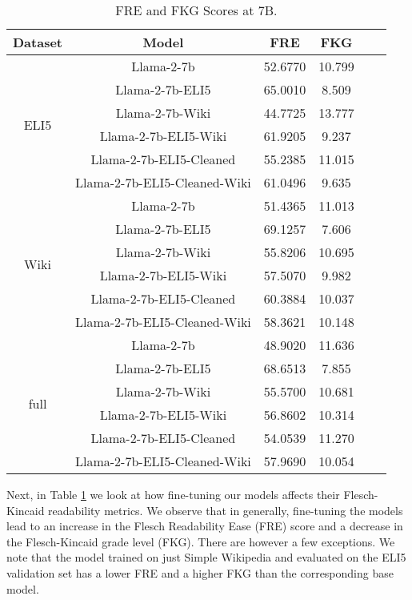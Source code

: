 \documentclass[11pt, oneside]{article}   	%
\begin{document}

\begin{table}[h]
\centering
\begin{tabular}{cccccc}
\hline
Dataset & Model & FRE & FKG \\
\hline
\multirow{6}{*}{ELI5} & Llama-2-7b & 52.6770 & 10.799 \\
 & Llama-2-7b-ELI5 & 65.0010 & 8.509 \\
 & Llama-2-7b-Wiki & 44.7725 & 13.777 \\
 & Llama-2-7b-ELI5-Wiki & 61.9205 & 9.237 \\
  & Llama-2-7b-ELI5-Cleaned & 55.2385 & 11.015 \\
 & Llama-2-7b-ELI5-Cleaned-Wiki & 61.0496 & 9.635 \\
\hline
\multirow{6}{*}{Wiki} & Llama-2-7b & 51.4365 & 11.013 \\
 & Llama-2-7b-ELI5 & 69.1257 & 7.606 \\
 & Llama-2-7b-Wiki & 55.8206 & 10.695 \\
 & Llama-2-7b-ELI5-Wiki & 57.5070 & 9.982 \\
  & Llama-2-7b-ELI5-Cleaned & 60.3884 & 10.037 \\
 & Llama-2-7b-ELI5-Cleaned-Wiki & 58.3621 & 10.148 \\
\hline
\multirow{6}{*}{full} & Llama-2-7b & 48.9020 & 11.636 \\
 & Llama-2-7b-ELI5 & 68.6513 & 7.855 \\
 & Llama-2-7b-Wiki & 55.5700 & 10.681 \\
 & Llama-2-7b-ELI5-Wiki & 56.8602 & 10.314 \\
  & Llama-2-7b-ELI5-Cleaned & 54.0539 & 11.270 \\
 & Llama-2-7b-ELI5-Cleaned-Wiki & 57.9690 & 10.054 \\
\hline
\end{tabular}
\caption{FRE and FKG Scores at 7B.}
\label{tab:flesch_scores_7B}
\end{table}
Next, in Table \ref{tab:flesch_scores_7B} we look at how fine-tuning our models affects their Flesch-Kincaid readability metrics.
We observe that in generally, fine-tuning the models lead to an increase in the Flesch Readability Ease (FRE) score and a decrease in the Flesch-Kincaid grade level (FKG). 
There are however a few exceptions.
We note that the model trained on just Simple Wikipedia and evaluated on the ELI5 validation set has a lower FRE and a higher FKG than the corresponding base model.
\end{document}
